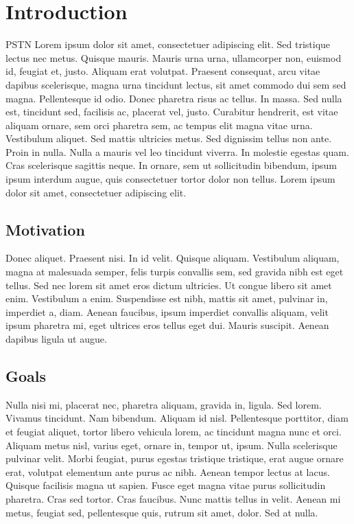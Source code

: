 \chapter{Introduction}
PSTN Lorem ipsum dolor sit amet, consectetuer adipiscing elit. Sed tristique lectus nec metus. Quisque mauris. Mauris urna urna, ullamcorper non, euismod id, feugiat et, justo. Aliquam erat volutpat. Praesent consequat, arcu vitae dapibus scelerisque, magna urna tincidunt lectus, sit amet commodo dui sem sed magna. Pellentesque id odio. Donec pharetra risus ac tellus. In massa. Sed nulla est, tincidunt sed, facilisis ac, placerat vel, justo. Curabitur hendrerit, est vitae aliquam ornare, sem orci pharetra sem, ac tempus elit magna vitae urna. Vestibulum aliquet. Sed mattis ultricies metus. Sed dignissim tellus non ante. Proin in nulla. Nulla a mauris vel leo tincidunt viverra. In molestie egestas quam. Cras scelerisque sagittis neque. In ornare, sem ut sollicitudin bibendum, ipsum ipsum interdum augue, quis consectetuer tortor dolor non tellus. Lorem ipsum dolor sit amet, consectetuer adipiscing elit.

\section{Motivation}
Donec aliquet. Praesent nisi. In id velit. Quisque aliquam. Vestibulum aliquam, magna at malesuada semper, felis turpis convallis sem, sed gravida nibh est eget tellus. Sed nec lorem sit amet eros dictum ultricies. Ut congue libero sit amet enim. Vestibulum a enim. Suspendisse est nibh, mattis sit amet, pulvinar in, imperdiet a, diam. Aenean faucibus, ipsum imperdiet convallis aliquam, velit ipsum pharetra mi, eget ultrices eros tellus eget dui. Mauris suscipit. Aenean dapibus ligula ut augue.

\section{Goals}
Nulla nisi mi, placerat nec, pharetra aliquam, gravida in, ligula. Sed lorem. Vivamus tincidunt. Nam bibendum. Aliquam id nisl. Pellentesque porttitor, diam et feugiat aliquet, tortor libero vehicula lorem, ac tincidunt magna nunc et orci. Aliquam metus nisl, varius eget, ornare in, tempor ut, ipsum. Nulla scelerisque pulvinar velit. Morbi feugiat, purus egestas tristique tristique, erat augue ornare erat, volutpat elementum ante purus ac nibh. Aenean tempor lectus at lacus. Quisque facilisis magna ut sapien. Fusce eget magna vitae purus sollicitudin pharetra. Cras sed tortor. Cras faucibus. Nunc mattis tellus in velit. Aenean mi metus, feugiat sed, pellentesque quis, rutrum sit amet, dolor. Sed at nulla.

